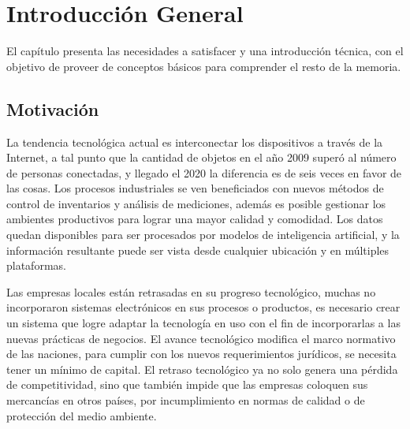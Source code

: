 \chapter{Introducción General}

\label{Chapter1}
\label{IntroGeneral}


\newcommand{\keyword}[1]{\textbf{#1}}
\newcommand{\tabhead}[1]{\textbf{#1}}
\newcommand{\code}[1]{\texttt{#1}}
\newcommand{\file}[1]{\texttt{\bfseries#1}}
\newcommand{\option}[1]{\texttt{\itshape#1}}
\newcommand{\grados}{$^{\circ}$}


El capítulo presenta las necesidades a satisfacer y una introducción técnica, con el objetivo de proveer de conceptos básicos para comprender el resto de la memoria.

\section{Motivación}
\label{ch1Motivacion}

La tendencia tecnológica actual es interconectar los dispositivos a través de la Internet, a tal punto que la cantidad de objetos en el año 2009 superó al número de personas conectadas, y llegado el 2020 la diferencia es de seis veces en favor de las cosas.
Los procesos industriales se ven beneficiados con nuevos métodos de control de inventarios y análisis de mediciones, además es posible gestionar los ambientes productivos para lograr una mayor calidad y comodidad.
Los datos quedan disponibles para ser procesados por modelos de inteligencia artificial, y la información resultante puede ser vista desde cualquier ubicación y en múltiples plataformas. 

Las empresas locales están retrasadas en su progreso tecnológico, muchas no incorporaron sistemas electrónicos en sus procesos o productos, es necesario crear un sistema que logre adaptar la tecnología en uso con el fin de incorporarlas a las nuevas prácticas de negocios.
El avance tecnológico modifica el marco normativo de las naciones, para cumplir con los nuevos requerimientos jurídicos, se necesita tener un mínimo de capital.
El retraso tecnológico ya no solo genera una pérdida de competitividad, sino que también impide que las empresas coloquen sus mercancías en otros países, por incumplimiento en normas de calidad o de protección del medio ambiente.
		
